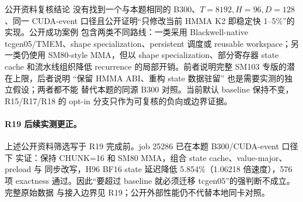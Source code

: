 \begin{decision}{公开资料复核结论}
没有找到一个与本题相同的 B300、\(T=8192,H=96,D=128\)、同一 CUDA-event
口径且公开证明“只修改当前 HMMA K2 即稳定快 1--5\%”的实现。公开成功案例
包含两类不同路线：一类采用 Blackwell-native tcgen05/TMEM、shape
specialization、persistent 调度或 reusable workspace；另一类仍使用 SM80-style
MMA，但以 shape specialization、部分寄存器 state cache 和流水线组织降低
recurrence 的局部开销。前者说明完整 SM103 专版的潜在上限，后者说明
``保留 HMMA ABI、重构 state 数据驻留'' 也是需要实测的独立假设；两者都不能
替代本题的同源 B300 对照。当前默认 baseline 保持不变，R15/R17/R18 的
opt-in 分支只作为可复核的负向或边界证据。
\end{decision}

\paragraph{R19 后续实测更正。}
上述公开资料筛选写于 R19 完成前。job 25286 已在本题 B300/CUDA-event 口径下
实证：保持 CHUNK=16 和 SM80 MMA，组合 state cache、value-major、preload 与
同步改写，H96 BF16 state 延迟降低 5.854\%（1.06218 倍速度），576 项 exactness
通过。因此“要超过 baseline 就必须迁移 tcgen05”的强判断不成立。完整原始数据
与接入边界见 R19；公开外部性能仍不代替本地同卡对照。
